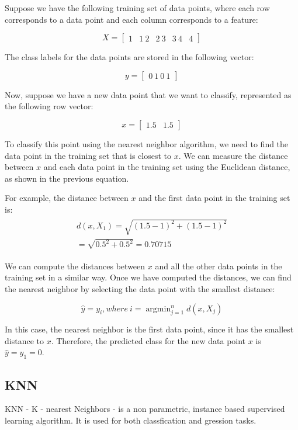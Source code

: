 Suppose we have the following training set of data points, where each row corresponds to a data point and each column corresponds to a feature:

$$X = \begin{bmatrix}
		1 & 1 \
		2 & 2 \
		3 & 3 \
		4 & 4
	\end{bmatrix}$$

The class labels for the data points are stored in the following vector:

$$y = \begin{bmatrix}
		0 \
		1 \
		0 \
		1
	\end{bmatrix}$$

Now, suppose we have a new data point that we want to classify, represented as the following row vector:

$$x = \begin{bmatrix}
		1.5 & 1.5
	\end{bmatrix}$$

To classify this point using the nearest neighbor algorithm, we need to find the data point in the training set that is closest to $x$. We can measure the distance between $x$ and each data point in the training set using the Euclidean distance, as shown in the previous equation.

For example, the distance between $x$ and the first data point in the training set is:
\begin{align*}
	\begin{split}
		d(x, X_1) = \sqrt{(1.5 - 1)^2 + (1.5 - 1)^2} \\
		= \sqrt{0.5^2 + 0.5^2} = 0.70715
	\end{split}
\end{align*}

We can compute the distances between $x$ and all the other data points in the training set in a similar way. Once we have computed the distances, we can find the nearest neighbor by selecting the data point with the smallest distance:

$$\hat{y} = y_i, where\ i = \operatorname{argmin}_{j=1}^n d(x, X_j)$$

In this case, the nearest neighbor is the first data point, since it has the smallest distance to $x$. Therefore, the predicted class for the new data point $x$ is $\hat{y} = y_1 = 0$.




\subsection{KNN}
KNN - K - nearest Neighbors - is a non parametric, instance based supervised learning algorithm. It is used for both classfication and gression tasks.

